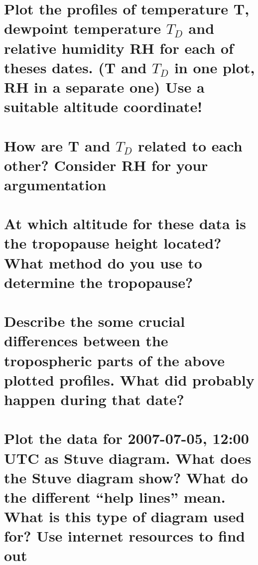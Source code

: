 \documentclass{article}
\begin{document}
\newpage
\section{Plot the profiles of temperature T, dewpoint temperature $T_D$ and relative humidity RH for each of theses dates. (T and $T_D$ in one plot, RH in a separate one) Use a suitable altitude coordinate!}



\newpage
\section{How are T and $T_D$ related to each other? Consider RH for your argumentation}



\newpage
\section{At which altitude for these data is the tropopause height located?What method do you use to determine the tropopause?}


\newpage
\section{Describe the some crucial differences between the tropospheric parts of the above plotted profiles. What did probably happen during that date?}



\newpage
\section{Plot the data for 2007-07-05, 12:00 UTC as Stuve diagram. What does the Stuve diagram show? What do the different “help lines” mean. What is this type of diagram used for? Use internet resources to find out}
\end{document}
